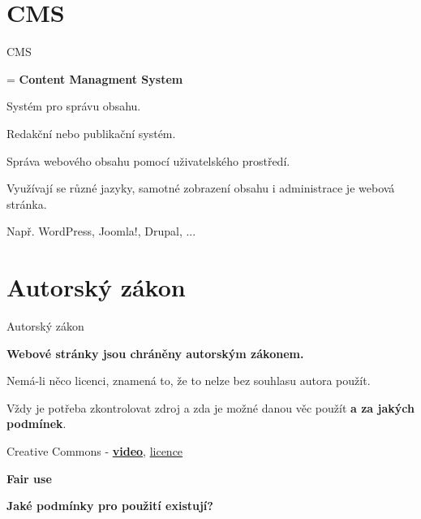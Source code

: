 \documentclass[aspectratio=1610]{beamer}
\begin{document}
\section{CMS}

\begin{frame}{CMS}
    \begin{cardTiny}
        \begin{flushleft}
            = \textbf{Content Managment System}

            Systém pro správu obsahu.

            Redakční nebo publikační systém.

            Správa webového obsahu pomocí uživatelského prostředí.

            Využívají se různé jazyky, samotné zobrazení obsahu i administrace je webová stránka.

            Např. WordPress, Joomla!, Drupal, ...
        \end{flushleft}
    \end{cardTiny}
\end{frame}



\section{Autorský zákon}

\begin{frame}{Autorský zákon}
    \begin{cardTiny}
        \begin{flushleft}
            \textbf{Webové stránky jsou chráněny autorským zákonem.}

            \vspace{2ex}
            Nemá-li něco licenci, znamená to, že to nelze bez souhlasu autora použít.

            Vždy je potřeba zkontrolovat zdroj a zda je možné danou věc použít \textbf{a za jakých podmínek}.

            \vspace{2ex}
            Creative Commons - \textbf{\href{https://www.youtube.com/watch?v=4ZvJGV6YF6Y}{video}}, \href{https://creativecommons.org/licenses/?lang=cs}{licence}
            
            \vspace{2ex}
            \textbf{Fair use}
        \end{flushleft}
    \end{cardTiny}
    \begin{cardTiny}
        \begin{center}
            \textbf{Jaké podmínky pro použití existují?}
        \end{center}
    \end{cardTiny}
\end{frame}
\end{document}
